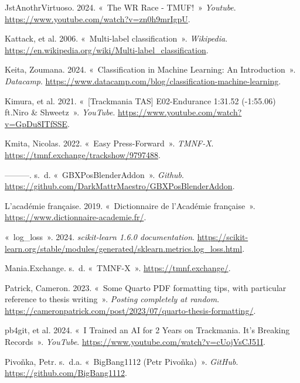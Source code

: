 \documentclass[
  oneside,
  open=any]{scrreprt}
\newlength{\cslhangindent}
\newenvironment{CSLReferences}[2] %
 {\begin{list}{}{%
  \setlength{\itemindent}{0pt}
  \setlength{\leftmargin}{0pt}
  \setlength{\parsep}{0pt}
  \ifodd #1
   \setlength{\leftmargin}{\cslhangindent}
   \setlength{\itemindent}{-1\cslhangindent}
  \fi
  \setlength{\itemsep}{#2\baselineskip}}}
 {\end{list}}
\begin{document}
\begin{CSLReferences}{1}{0}
JstAnothrVirtuoso. 2024. {«~The WR Race - TMUF!~»} \emph{Youtube}.
\url{https://www.youtube.com/watch?v=zn0h9mrIgpU}.

Kattack, et al. 2006. {«~Multi-label classification~»}.
\emph{Wikipedia}.
\url{https://en.wikipedia.org/wiki/Multi-label_classification}.

Keita, Zoumana. 2024. {«~Classification in Machine Learning: An
Introduction~»}. \emph{Datacamp}.
\url{https://www.datacamp.com/blog/classification-machine-learning}.

Kimura, et al. 2021. {«~{[}Trackmania TAS{]} E02-Endurance 1:31.52
(-1:55.06) ft.Niro \& Shweetz~»}. \emph{YouTube}.
\url{https://www.youtube.com/watch?v=GpDu8ITfSSE}.

Kmita, Nicolas. 2022. {«~Easy Press-Forward~»}. \emph{TMNF-X}.
\url{https://tmnf.exchange/trackshow/9797488}.

---------. s.~d. {«~GBXPosBlenderAddon~»}. \emph{Github}.
\url{https://github.com/DarkMattrMaestro/GBXPosBlenderAddon}.

L'académie française. 2019. {«~Dictionnaire de l'Académie française~»}.
\url{https://www.dictionnaire-academie.fr/}.

{«~log\_loss~»}. 2024. \emph{scikit-learn 1.6.0 documentation}.
\url{https://scikit-learn.org/stable/modules/generated/sklearn.metrics.log_loss.html}.

Mania.Exchange. s.~d. {«~TMNF-X~»}. \url{https://tmnf.exchange/}.

Patrick, Cameron. 2023. {«~Some Quarto PDF formatting tips, with
particular reference to thesis writing~»}. \emph{Posting completely at
random}.
\url{https://cameronpatrick.com/post/2023/07/quarto-thesis-formatting/}.

pb4git, et al. 2024. {«~I Trained an AI for 2 Years on Trackmania. It's
Breaking Records~»}. \emph{YouTube}.
\url{https://www.youtube.com/watch?v=cUojVsCJ51I}.

Pivoňka, Petr. s.~d.a. {«~BigBang1112 (Petr Pivoňka)~»}. \emph{GitHub}.
\url{https://github.com/BigBang1112}.


\end{CSLReferences}
\end{document}
